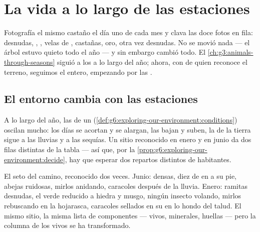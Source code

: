 \chapter{La vida a lo largo de las estaciones}\label{ch:g6:life-through-seasons}

Fotografía el mismo castaño el día uno de cada mes y clava las doce
fotos en fila:  desnudas, , , velas de , castañas,
oro, otra vez  desnudas. No se movió nada --- el árbol estuvo
quieto todo el año --- y sin embargo cambió todo. El
\cref{ch:g3:animals-through-seasons} siguió a los  a lo largo
del año; ahora, con  de quien reconoce el terreno, seguimos el
 entero, empezando por las .

\section{El entorno cambia con las estaciones}

\begin{proposition}\label{prop:g6:life-through-seasons:conditions}
A lo largo del año, las  de un 
(\cref{def:g6:exploring-our-environment:conditions}) oscilan mucho:
los días se acortan y se alargan, las  bajan y suben, la
 de la tierra sigue a las lluvias y a las sequías. Un sitio
reconocido en enero y en junio da dos filas distintas de la tabla ---
así que, por la \cref{prop:g6:exploring-our-environment:decide}, hay
que esperar dos repartos distintos de habitantes.
\end{proposition}
\admitted

\begin{example}\label{ex:g6:life-through-seasons:hedge}
El seto del camino, reconocido dos veces. Junio:  densas, diez
 de  en  a su pie, abejas ruidosas, mirlos anidando,
caracoles después de la lluvia. Enero: ramitas desnudas, el verde
reducido a hiedra y musgo, ningún insecto volando, mirlos rebuscando en
la hojarasca, caracoles sellados en su  en lo hondo del talud. El
mismo sitio, la misma lista de componentes --- vivos, minerales,
huellas --- pero la columna de los vivos se ha transformado.
\end{example}

